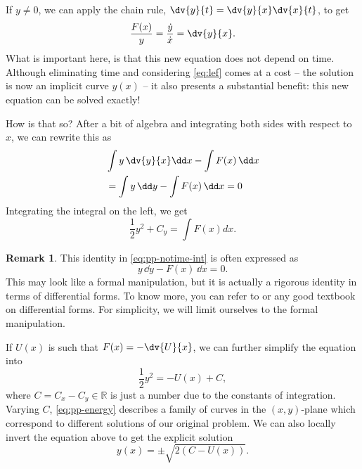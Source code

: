 \documentclass[english,fontsize=11pt,paper=b5]{scrbook}
\numberwithin{equation}{chapter}
\theoremstyle{definition}
\newtheorem{remark}{Remark}[chapter]
\begin{document}
    If $y\neq0$, we can apply the chain rule, $\dv{y}{t} = \dv{y}{x} \dv{x}{t}$, to get
    \begin{equation}\label{eq:lef}
      \frac{F(x)}y = \frac{\dot y}{\dot x} = \dv{y}{x}.
    \end{equation}
    What is important here, is that this new equation does not depend on time. Although eliminating time and considering \eqref{eq:lef} comes at a cost -- the solution is now an implicit curve $y(x)$ -- it also presents a substantial benefit: this new equation can be solved exactly!

    How is that so? After a bit of algebra and integrating both sides with respect to $x$, we can rewrite this as
    \begin{align}
      &\int y\,\dv{y}{x}\dd x - \int F(x)\, \dd x \notag \\
      & = \int y\,\dd y - \int F(x)\, \dd x = 0 \label{eq:pp-notime-int}
    \end{align}
    Integrating the integral on the left, we get
    \begin{equation}
      \frac12 y^2 + C_y = \int F(x) dx.
    \end{equation}
    \begin{remark}
        This identity in \eqref{eq:pp-notime-int} is often expressed as
        \begin{equation}
        y\,\dd y - F(x)\, \dd x = 0.
        \end{equation}
        This may look like a formal manipulation, but it is actually a rigorous identity in terms of differential forms.
        To know more, you can refer to \cite[Equation (5.1) with $f=y$ and Remark 5.1.3]{lectures:aom:seri} or any good textbook on differential forms.
        For simplicity, we will limit ourselves to the formal manipulation.
    \end{remark}

    If $U(x)$ is such that $F(x) = -\dv{U}{x}$, we can further simplify the equation into
    \begin{equation}\label{eq:pp-energy}
      \frac12 y^2 = -U(x) + C,
    \end{equation}
    where $C = C_x - C_y \in\mathbb{R}$ is just a number due to the constants of integration. Varying $C$, \eqref{eq:pp-energy} describes a family of curves in the $(x,y)$-plane which correspond to different solutions of our original problem.
    We can also locally invert the equation above to get the explicit solution
    \begin{equation}
      y(x) = \pm \sqrt{2(C-U(x))}.
    \end{equation}
\end{document}
